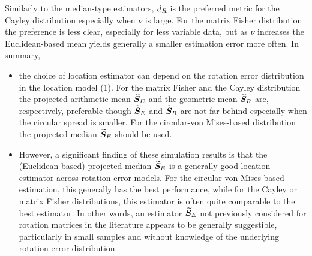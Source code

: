 Similarly to the median-type estimators, ${d_R}$ is the preferred metric for the Cayley distribution especially when $\nu$ is large.  For the  matrix Fisher distribution the preference is less clear, especially for less variable data, but as $\nu$ increases the Euclidean-based mean yields generally a smaller estimation error more often. In summary,
\begin{itemize}
\item the choice of location estimator can depend on the rotation error distribution in the location model (1).  For the matrix Fisher and the Cayley distribution  the projected arithmetic mean ${\widehat{\bm S}_E}$ and the geometric mean ${\widehat{\bm S}_R}$ are, respectively, preferable though ${\widetilde{\bm S}_E}$ and ${\widetilde{\bm S}_R}$ are not far behind especially when the circular spread is smaller. For the circular-von Mises-based distribution  the projected median ${\widetilde{\bm S}_E}$  should be used.

\item  However, a significant finding of these simulation results is that the (Euclidean-based)  projected median ${\widetilde{\bm S}_E}$ is a generally good location estimator across rotation error models.  For the circular-von Mises-based estimation, this generally has the best performance, while for the Cayley or matrix Fisher distributions, this estimator is often quite comparable to the best estimator.  In other words, an estimator ${\widetilde{\bm S}_E}$ not previously considered for rotation matrices in the literature appears to be generally suggestible, particularly in small samples and without knowledge of the underlying rotation error distribution.

\end{itemize}